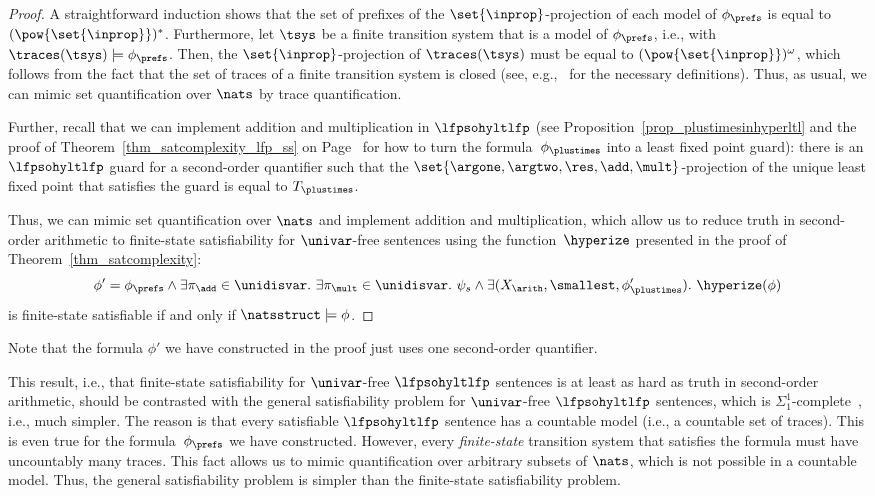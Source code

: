\begin{proof}
A straightforward induction shows that the set of prefixes of the $\set{\inprop}$-projection of each model of $\phi_\prefs$ is equal to $(\pow{\set{\inprop}})^*$.
Furthermore, let $\tsys$ be a finite transition system that is a model of $\phi_\prefs$, i.e., with $\traces(\tsys) \models \phi_\prefs$. 
Then, the $\set{\inprop}$-projection of $\traces(\tsys)$ must be equal to $(\pow{\set{\inprop}})^\omega$, which follows from the fact that the set of traces of a finite transition system is closed (see, e.g.,~\cite{BK08} for the necessary definitions).
Thus, as usual, we can mimic set quantification over $\nats$ by trace quantification. 

Further, recall that we can implement addition and multiplication in $\lfpsohyltlfp$ (see Proposition~\ref{prop_plustimesinhyperltl} and the proof of Theorem~\ref{thm_satcomplexity_lfp_ss} on Page~\pageref{pageref_plustimesaslfp} for how to turn the formula~$\phi_\plustimes$ into a least fixed point guard): there is an $\lfpsohyltlfp$ guard for a second-order quantifier such that the $\set{\argone, \argtwo, \res, \add, \mult}$-projection of the unique least fixed point that satisfies the guard is equal to $T_\plustimes$.

Thus, we can mimic set quantification over $\nats$ and implement addition and multiplication, which allow us to reduce truth in second-order arithmetic to finite-state satisfiability for $\univar$-free sentences using the function~$\hyperize$ presented in the proof of Theorem~\ref{thm_satcomplexity}:
\[
\phi' = \phi_\prefs \wedge \exists \pi_\add \in \unidisvar.\ \exists \pi_\mult \in \unidisvar.\ \psi_s \wedge \exists(X_\arith, \smallest, \phi_\plustimes').\ \hyperize(\phi)
\]
is finite-state satisfiable if and only if $\natsstruct\models\phi$.
\end{proof}
Note that the formula $\phi'$ we have constructed in the proof just uses one second-order quantifier.

This result, i.e., that finite-state satisfiability for $\univar$-free $\lfpsohyltlfp$  sentences is at least as hard as truth in second-order arithmetic, should be contrasted with the general satisfiability problem for $\univar$-free $\lfpsohyltlfp$ sentences, which is  $\Sigma_1^1$-complete~\cite{sohypercomplexity}, i.e., much simpler. 
The reason is that every satisfiable $\lfpsohyltlfp$ sentence has a countable model (i.e., a countable set of traces). 
This is even true for the formula~$\phi_\prefs$ we have constructed. However, every \emph{finite-state} transition system that satisfies the formula must have uncountably many traces. 
This fact allows us to mimic quantification over arbitrary subsets of $\nats$, which is not possible in a countable model. 
Thus, the general satisfiability problem is simpler than the finite-state satisfiability problem.

